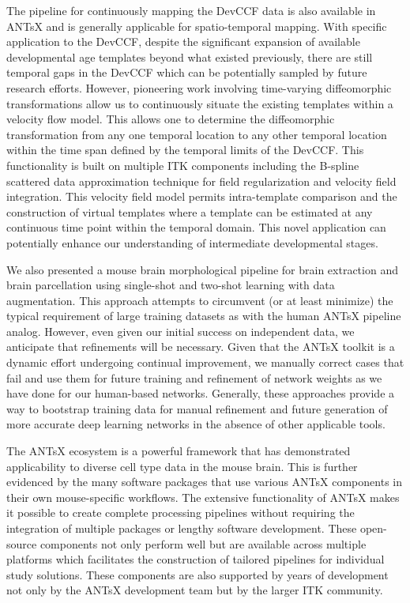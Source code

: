 \documentclass[
  12pt,
]{article}
\begin{document}
The pipeline for continuously mapping the DevCCF data is also available
in ANTsX and is generally applicable for spatio-temporal mapping. With
specific application to the DevCCF, despite the significant expansion of
available developmental age templates beyond what existed previously,
there are still temporal gaps in the DevCCF which can be potentially
sampled by future research efforts. However, pioneering work involving
time-varying diffeomorphic transformations allow us to continuously
situate the existing templates within a velocity flow model. This allows
one to determine the diffeomorphic transformation from any one temporal
location to any other temporal location within the time span defined by
the temporal limits of the DevCCF. This functionality is built on
multiple ITK components including the B-spline scattered data
approximation technique for field regularization and velocity field
integration. This velocity field model permits intra-template comparison
and the construction of virtual templates where a template can be
estimated at any continuous time point within the temporal domain. This
novel application can potentially enhance our understanding of
intermediate developmental stages.

We also presented a mouse brain morphological pipeline for brain
extraction and brain parcellation using single-shot and two-shot
learning with data augmentation. This approach attempts to circumvent
(or at least minimize) the typical requirement of large training
datasets as with the human ANTsX pipeline analog. However, even given
our initial success on independent data, we anticipate that refinements
will be necessary. Given that the ANTsX toolkit is a dynamic effort
undergoing continual improvement, we manually correct cases that fail
and use them for future training and refinement of network weights as we
have done for our human-based networks. Generally, these approaches
provide a way to bootstrap training data for manual refinement and
future generation of more accurate deep learning networks in the absence
of other applicable tools.

The ANTsX ecosystem is a powerful framework that has demonstrated
applicability to diverse cell type data in the mouse brain. This is
further evidenced by the many software packages that use various ANTsX
components in their own mouse-specific workflows. The extensive
functionality of ANTsX makes it possible to create complete processing
pipelines without requiring the integration of multiple packages or
lengthy software development. These open-source components not only
perform well but are available across multiple platforms which
facilitates the construction of tailored pipelines for individual study
solutions. These components are also supported by years of development
not only by the ANTsX development team but by the larger ITK community.
\end{document}
